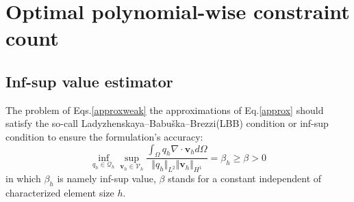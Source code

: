 \section{Optimal polynomial-wise constraint count}
\subsection{Inf-sup value estimator}
The problem of Eqs.\eqref{approxweak} the approximations of Eq.\eqref{approx} should satisfy the so-call Ladyzhenskaya–Babuška–Brezzi(LBB) condition or inf-sup condition \cite{bathe1996} to ensure the formulation's accuracy:
\begin{equation}
    \inf_{q_h \in \mathcal Q_h} \sup_{\boldsymbol v_h \in \mathcal V_h} \frac{\int_{\Omega} q_h \nabla \cdot \boldsymbol v_h d\Omega}{\Vert q_h \Vert_{L^2} \Vert \boldsymbol v_h \Vert_{H^1}} = \beta_h \ge \beta > 0
\end{equation}
in which $\beta_h$ is namely inf-sup value, $\beta$ stands for a constant independent of characterized element size $h$.

